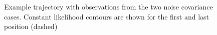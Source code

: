 \documentclass[10pt,twocolumn,twoside]{IEEEtran}
\begin{document}
\begin{figure}[!t]
\centering
{}
\\
\\
\caption{Example trajectory with observations from the two noise covariance cases. Constant likelihood contours are shown for the first and last position (dashed)}
\label{fig:example_trajectories}
\end{figure}
\end{document}
